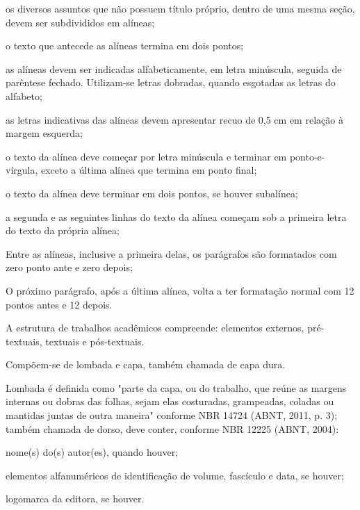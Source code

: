 \begin{Desenvolvimento}
\begin{alinea}
  \item os diversos assuntos que não possuem título próprio, dentro de uma mesma seção, devem ser subdivididos em alíneas;
  \item o texto que antecede as alíneas termina em dois pontos;
  \item as alíneas devem ser indicadas alfabeticamente, em letra minúscula, seguida de parêntese fechado. Utilizam-se letras dobradas, quando esgotadas as letras do alfabeto;
  \item as letras indicativas das alíneas devem apresentar recuo de 0,5 cm em relação à margem esquerda;
  \item o texto da alínea deve começar por letra minúscula e terminar em ponto-e-vírgula, exceto a última alínea que termina em ponto final;
  \item o texto da alínea deve terminar em dois pontos, se houver subalínea;
  \item a segunda e as seguintes linhas do texto da alínea começam sob a primeira letra do texto da própria alínea;
  \item Entre as alíneas, inclusive a primeira delas, os parágrafos são formatados com zero ponto ante e zero depois;
  \item O próximo parágrafo, após a última alínea, volta a ter formatação normal com 12 pontos antes e 12 depois.
\end{alinea}

A estrutura de trabalhos acadêmicos compreende: elementos externos, pré-textuais, textuais e pós-textuais.

Compõem-se de lombada e capa, também chamada de capa dura.

Lombada é definida como "parte da capa, ou do trabalho, que reúne as margens internas ou dobras das folhas, sejam elas costuradas, grampeadas, coladas ou mantidas juntas de outra maneira" conforme NBR 14724 (ABNT, 2011, p. 3); também chamada de dorso, deve conter, conforme NBR 12225 (ABNT, 2004):

\begin{alinea}
  \item nome(s) do(s) autor(es), quando houver;
  \item elementos alfanuméricos de identificação de volume, fascículo e data, se houver;
  \item logomarca da editora, se houver.
\end{alinea}


\end{Desenvolvimento}
